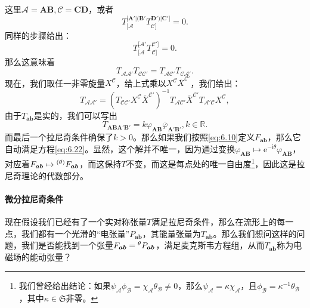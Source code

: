 这里$\mathcal{A} =\boldsymbol{AB} ,\mathcal{C} =\boldsymbol{CD}$，或者
\begin{equation*}
	T_{[\mathcal{A}}^{[\boldsymbol{A} '|(\boldsymbol{B} '} T_{\mathcal{C}]}^{\boldsymbol{D} ') |\boldsymbol{C} ']} =0.
\end{equation*}
同样的步骤给出：
\begin{equation*}
	T_{[\mathcal{A}}^{[\mathcal{A} '} T_{\mathcal{C}]}^{\mathcal{C} ']} =0.
\end{equation*}
那么这意味着
\begin{equation*}
	T_{\mathcal{AA} '} T_{\mathcal{CC} '} =T_{\mathcal{AC} '} T_{\mathcal{CA} '} .
\end{equation*}
现在，我们取任一非零旋量$X^{\mathcal{C}}$，给上式乘以$X^{\mathcal{C}}\overline{X}^{\mathcal{C} '}$，我们给出：
\begin{equation*}
	T_{\mathcal{AA} '} =(T_{\mathcal{CC} '} X^{\mathcal{C}}\overline{X}^{\mathcal{C} '} )^{-1} T_{\mathcal{AC} '}\overline{X}^{\mathcal{C} '} T_{\mathcal{A} '\mathcal{C}} X^{\mathcal{C}} ,
\end{equation*}
由于$T_{\boldsymbol{ab}}$是实的，我们可以写出
\begin{equation}
	T_{\boldsymbol{ABA} '\boldsymbol{B} '} =k\varphi _{\boldsymbol{AB}}\overline{\varphi }_{\boldsymbol{A} '\boldsymbol{B} '} ,k\in \mathbb{R} .
	\label{eq:6.24}
\end{equation}
而最后一个拉尼奇条件确保了$k >0$。那么如果我们按照\ref{eq:6.10}定义$F_{\boldsymbol{ab}}$，那么它自动满足方程\ref{eq:6.22}。显然，这个解并不唯一，因为通过变换$\varphi _{\boldsymbol{AB}} \mapsto \mathrm{e}^{-\mathrm{i} \theta } \varphi _{\boldsymbol{AB}}$，对应着$F_{\boldsymbol{ab}} \mapsto \prescript{( \theta )}{}{} F_{\boldsymbol{ab}}$，而这保持$T$不变，而这是每点处的唯一自由度\footnote{我们曾经给出结论：如果$\psi _{\mathcal{A}} \phi _{\mathcal{B}} =\chi _{\mathcal{A}} \theta _{\mathcal{B}} \neq 0$，那么$\psi _{\mathcal{A}} =\kappa \chi _{\mathcal{A}}$，且$\phi _{\mathcal{B}} =\kappa ^{-1} \theta _{\mathcal{B}}$，其中$\kappa \in \mathfrak{S}$非零。}，因此这是拉尼奇理论的代数部分。


\paragraph{微分拉尼奇条件}

现在假设我们已经有了一个实对称张量$T$满足拉尼奇条件，那么在流形上的每一点，我们都有一个光滑的“电张量”$P_{\boldsymbol{ab}}$，其能量张量为$T_{\boldsymbol{ab}}$。那么我们想问这样的问题，我们是否能找到一个张量$F_{\boldsymbol{ab}} =\prescript{\theta }{}{} P_{\boldsymbol{ab}}$，满足麦克斯韦方程组，从而$T_{\boldsymbol{ab}}$称为电磁场的能动张量？




